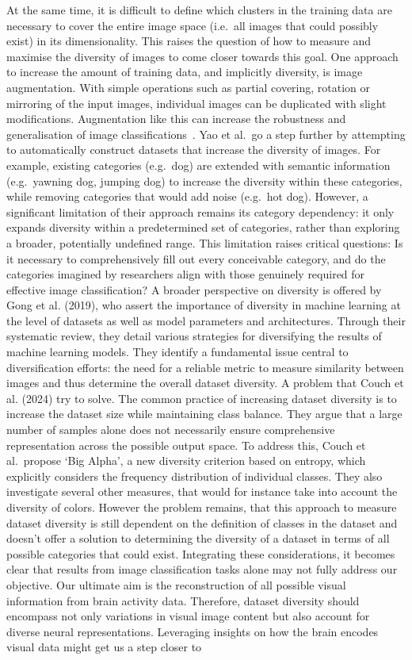 At the same time, it is difficult to define which clusters in the training data are necessary to cover the entire image space (i.e.\ all images that could possibly exist) in its dimensionality. This raises the question of how to measure and maximise the diversity of images to come closer towards this goal. One approach to increase the amount of training data, and implicitly diversity, is image augmentation. With simple operations such as partial covering, rotation or mirroring of the input images, individual images can be duplicated with slight modifications. Augmentation like this can increase the robustness and generalisation of image classifications~\cite{shortenSurveyImageData2019}. Yao et al.\ go a step further by attempting to automatically construct datasets that increase the diversity of images. For example, existing categories (e.g.\ dog) are extended with semantic information (e.g.\ yawning dog, jumping dog) to increase the diversity within these categories, while removing categories that would add noise (e.g.\ hot dog). However, a significant limitation of their approach remains its category dependency: it only expands diversity within a predetermined set of categories, rather than exploring a broader, potentially undefined range. This limitation raises critical questions: Is it necessary to comprehensively fill out every conceivable category, and do the categories imagined by researchers align with those genuinely required for effective image classification? A broader perspective on diversity is offered by Gong et al. (2019), who assert the importance of diversity in machine learning at the level of datasets as well as model parameters and architectures. Through their systematic review, they detail various strategies for diversifying the results of machine learning models. They identify a fundamental issue central to diversification efforts: the need for a reliable metric to measure similarity between images and thus determine the overall dataset diversity. A problem that Couch et al. (2024) try to solve. The common practice of increasing dataset diversity is to increase the dataset size while maintaining class balance. They argue that a large number of samples alone does not necessarily ensure comprehensive representation across the possible output space. To address this, Couch et al.\ propose `Big Alpha', a new diversity criterion based on entropy, which explicitly considers the frequency distribution of individual classes. They also investigate several other measures, that would for instance take into account the diversity of colors. However the problem remains, that this approach to measure dataset diversity is still dependent on the definition of classes in the dataset and doesn't offer a solution to determining the diversity of a dataset in terms of all possible categories that could exist. Integrating these considerations, it becomes clear that results from image classification tasks alone may not fully address our objective. Our ultimate aim is the reconstruction of all possible visual information from brain activity data. Therefore, dataset diversity should encompass not only variations in visual image content but also account for diverse neural representations. Leveraging insights on how the brain encodes visual data might get us a step closer to 